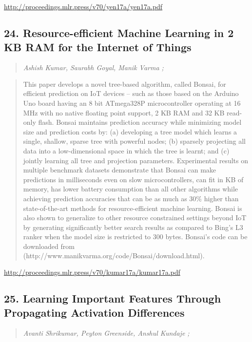 \documentclass{article}
\begin{document}
\href{http://proceedings.mlr.press/v70/yen17a/yen17a.pdf}{http://proceedings.mlr.press/v70/yen17a/yen17a.pdf}

\subsection{24. Resource-efficient Machine Learning in 2 KB RAM for the Internet of Things}

\begin{quote}
\footnotesize{\textit{Ashish Kumar, Saurabh Goyal, Manik Varma ;}}
\end{quote}

\begin{quote}
    This paper develops a novel tree-based algorithm, called Bonsai, for efficient prediction on IoT devices – such as those based on the Arduino Uno board having an 8 bit ATmega328P microcontroller operating at 16 MHz with no native floating point support, 2 KB RAM and 32 KB read-only flash. Bonsai maintains prediction accuracy while minimizing model size and prediction costs by: (a) developing a tree model which learns a single, shallow, sparse tree with powerful nodes; (b) sparsely projecting all data into a low-dimensional space in which the tree is learnt; and (c) jointly learning all tree and projection parameters. Experimental results on multiple benchmark datasets demonstrate that Bonsai can make predictions in milliseconds even on slow microcontrollers, can fit in KB of memory, has lower battery consumption than all other algorithms while achieving prediction accuracies that can be as much as 30\% higher than state-of-the-art methods for resource-efficient machine learning. Bonsai is also shown to generalize to other resource constrained settings beyond IoT by generating significantly better search results as compared to Bing’s L3 ranker when the model size is restricted to 300 bytes. Bonsai’s code can be downloaded from (http://www.manikvarma.org/code/Bonsai/download.html).  \end{quote}

\href{http://proceedings.mlr.press/v70/kumar17a/kumar17a.pdf}{http://proceedings.mlr.press/v70/kumar17a/kumar17a.pdf}

\subsection{25. Learning Important Features Through Propagating Activation Differences}

\begin{quote}
\footnotesize{\textit{Avanti Shrikumar, Peyton Greenside, Anshul Kundaje ;}}
\end{quote}
\end{document}
